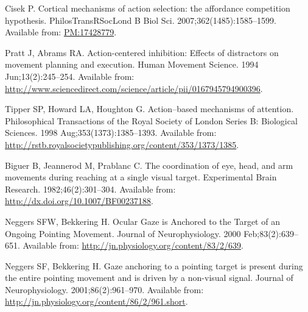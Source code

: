\documentclass[10pt,letterpaper]{article}
\begin{document}
\nolinenumbers

%
%
%
\begin{thebibliography}{10}

Cisek P.
\newblock Cortical mechanisms of action selection: the affordance competition
  hypothesis.
\newblock PhilosTransRSocLond B Biol Sci. 2007;362(1485):1585--1599.
\newblock Available from: \url{PM:17428779}.

Pratt J, Abrams RA.
\newblock Action-centered inhibition: {Effects} of distractors on movement
  planning and execution.
\newblock Human Movement Science. 1994 Jun;13(2):245--254.
\newblock Available from:
  \url{http://www.sciencedirect.com/science/article/pii/0167945794900396}.

Tipper SP, Howard LA, Houghton G.
\newblock Action–based mechanisms of attention.
\newblock Philosophical Transactions of the Royal Society of London Series B:
  Biological Sciences. 1998 Aug;353(1373):1385--1393.
\newblock Available from:
  \url{http://rstb.royalsocietypublishing.org/content/353/1373/1385}.

Biguer B, Jeannerod M, Prablanc C.
\newblock The coordination of eye, head, and arm movements during reaching at a
  single visual target.
\newblock Experimental Brain Research. 1982;46(2):301--304.
\newblock Available from: \url{http://dx.doi.org/10.1007/BF00237188}.

Neggers SFW, Bekkering H.
\newblock Ocular {Gaze} is {Anchored} to the {Target} of an {Ongoing}
  {Pointing} {Movement}.
\newblock Journal of Neurophysiology. 2000 Feb;83(2):639--651.
\newblock Available from: \url{http://jn.physiology.org/content/83/2/639}.

Neggers SF, Bekkering H.
\newblock Gaze anchoring to a pointing target is present during the entire
  pointing movement and is driven by a non-visual signal.
\newblock Journal of Neurophysiology. 2001;86(2):961--970.
\newblock Available from:
  \url{http://jn.physiology.org/content/86/2/961.short}.


\end{thebibliography}
\end{document}
